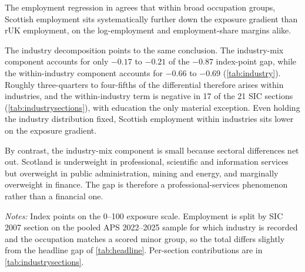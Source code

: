 The employment regression in  agrees that within broad occupation groups, Scottish employment sits systematically further down the exposure gradient than rUK employment, on the log-employment and employment-share margins alike.
 
The industry decomposition points to the same conclusion. The industry-mix component accounts for only $-0.17$ to $-0.21$ of the $-0.87$ index-point gap, while the within-industry component accounts for $-0.66$ to $-0.69$ (\cref{tab:industry}). Roughly three-quarters to four-fifths of the differential therefore arises within industries, and the within-industry term is negative in 17 of the 21 SIC sections (\cref{tab:industrysections}), with education the only material exception. Even holding the industry distribution fixed, Scottish employment within industries sits lower on the exposure gradient.
 
By contrast, the industry-mix component is small because sectoral differences net out. Scotland is underweight in professional, scientific and information services but overweight in public administration, mining and energy, and marginally overweight in finance. The gap is therefore a professional-services phenomenon rather than a financial one.
 
\begin{table}[t]
\centering
\caption{Industry-mix and within-industry components of the differential}
\label{tab:industry}
\small

\begin{minipage}{0.92\textwidth}
\vspace{0.4em}\footnotesize
\textit{Notes:} Index points on the 0--100 exposure scale. Employment is split by SIC 2007 section on the pooled APS 2022--2025 sample for which industry is recorded and the occupation matches a scored minor group, so the total differs slightly from the headline gap of \cref{tab:headline}. Per-section contributions are in \cref{tab:industrysections}.
\end{minipage}
\end{table}
 
